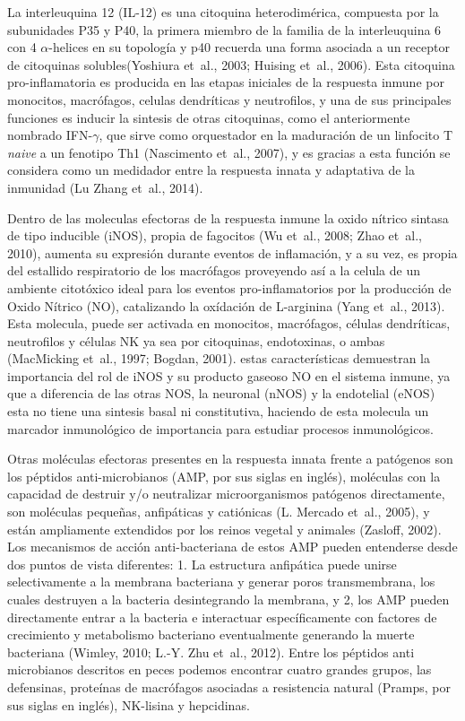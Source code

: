 \documentclass[12pt,letterpaper,oneside]{scrbook}
\begin{document}
La interleuquina 12 (IL-12) es una citoquina heterodimérica, compuesta
por la subunidades P35 y P40, la primera miembro de la familia de la
interleuquina 6 con 4 \(\alpha\)-helices en su topología y p40 recuerda
una forma asociada a un receptor de citoquinas solubles(Yoshiura et~al.,
2003; Huising et~al., 2006). Esta citoquina pro-inflamatoria es
producida en las etapas iniciales de la respuesta inmune por monocitos,
macrófagos, celulas dendríticas y neutrofilos, y una de sus principales
funciones es inducir la sintesis de otras citoquinas, como el
anteriormente nombrado IFN-\(\gamma\), que sirve como orquestador en la
maduración de un linfocito T \emph{naive} a un fenotipo Th1 (Nascimento
et~al., 2007), y es gracias a esta función se considera como un
medidador entre la respuesta innata y adaptativa de la inmunidad (Lu
Zhang et~al., 2014).

Dentro de las moleculas efectoras de la respuesta inmune la oxido
nítrico sintasa de tipo inducible (iNOS), propia de fagocitos (Wu
et~al., 2008; Zhao et~al., 2010), aumenta su expresión durante eventos
de inflamación, y a su vez, es propia del estallido respiratorio de los
macrófagos proveyendo así a la celula de un ambiente citotóxico ideal
para los eventos pro-inflamatorios por la producción de Oxido Nítrico
(NO), catalizando la oxídación de L-arginina (Yang et~al., 2013). Esta
molecula, puede ser activada en monocitos, macrófagos, células
dendríticas, neutrofilos y células NK ya sea por citoquinas,
endotoxinas, o ambas (MacMicking et~al., 1997; Bogdan, 2001). estas
características demuestran la importancia del rol de iNOS y su producto
gaseoso NO en el sistema inmune, ya que a diferencia de las otras NOS,
la neuronal (nNOS) y la endotelial (eNOS) esta no tiene una sintesis
basal ni constitutiva, haciendo de esta molecula un marcador
inmunológico de importancia para estudiar procesos inmunológicos.

Otras moléculas efectoras presentes en la respuesta innata frente a
patógenos son los péptidos anti-microbianos (AMP, por sus siglas en
inglés), moléculas con la capacidad de destruir y/o neutralizar
microorganismos patógenos directamente, son moléculas pequeñas,
anfipáticas y catiónicas (L. Mercado et~al., 2005), y están ampliamente
extendidos por los reinos vegetal y animales (Zasloff, 2002). Los
mecanismos de acción anti-bacteriana de estos AMP pueden entenderse
desde dos puntos de vista diferentes: 1. La estructura anfipática puede
unirse selectivamente a la membrana bacteriana y generar poros
transmembrana, los cuales destruyen a la bacteria desintegrando la
membrana, y 2, los AMP pueden directamente entrar a la bacteria e
interactuar específicamente con factores de crecimiento y metabolismo
bacteriano eventualmente generando la muerte bacteriana (Wimley, 2010;
L.-Y. Zhu et~al., 2012). Entre los péptidos anti microbianos descritos
en peces podemos encontrar cuatro grandes grupos, las defensinas,
proteínas de macrófagos asociadas a resistencia natural (Pramps, por sus
siglas en inglés), NK-lisina y hepcidinas.
\end{document}
